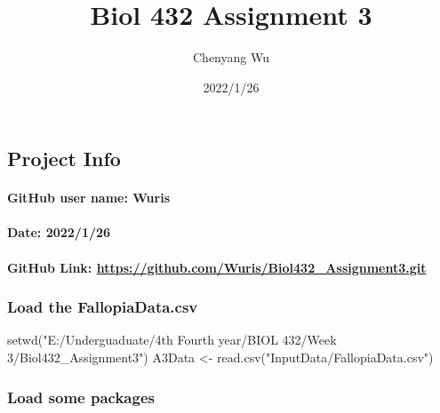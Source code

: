 \documentclass[
]{article}
\title{Biol 432 Assignment 3}
\author{Chenyang Wu}
\date{2022/1/26}
\newenvironment{Shaded}{\begin{snugshade}}{\end{snugshade}}
\newcommand{\FunctionTok}[1]{\textcolor[rgb]{0.00,0.00,0.00}{#1}}
\newcommand{\NormalTok}[1]{#1}
\newcommand{\OtherTok}[1]{\textcolor[rgb]{0.56,0.35,0.01}{#1}}
\newcommand{\StringTok}[1]{\textcolor[rgb]{0.31,0.60,0.02}{#1}}
\begin{document}
\maketitle

\hypertarget{project-info}{%
\subsection{Project Info}\label{project-info}}

\hypertarget{github-user-name-wuris}{%
\paragraph{\texorpdfstring{\textbf{GitHub user name}:
Wuris}{GitHub user name: Wuris}}\label{github-user-name-wuris}}

\hypertarget{date-2022126}{%
\paragraph{\texorpdfstring{\textbf{Date}:
2022/1/26}{Date: 2022/1/26}}\label{date-2022126}}

\hypertarget{github-link-httpsgithub.comwurisbiol432_assignment3.git}{%
\paragraph{\texorpdfstring{\textbf{GitHub Link}:
\url{https://github.com/Wuris/Biol432_Assignment3.git}}{GitHub Link: https://github.com/Wuris/Biol432\_Assignment3.git}}\label{github-link-httpsgithub.comwurisbiol432_assignment3.git}}

\hypertarget{load-the-fallopiadata.csv}{%
\subsubsection{Load the
FallopiaData.csv}\label{load-the-fallopiadata.csv}}

\begin{Shaded}
\begin{Highlighting}[]
\FunctionTok{setwd}\NormalTok{(}\StringTok{"E:/Underguaduate/4th Fourth year/BIOL 432/Week 3/Biol432\_Assignment3"}\NormalTok{)}
\NormalTok{A3Data }\OtherTok{\textless{}{-}} \FunctionTok{read.csv}\NormalTok{(}\StringTok{"InputData/FallopiaData.csv"}\NormalTok{)}
\end{Highlighting}
\end{Shaded}

\hypertarget{load-some-packages}{%
\subsubsection{Load some packages}\label{load-some-packages}}
\end{document}
